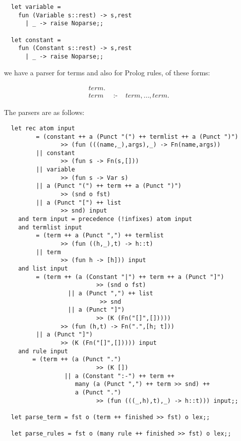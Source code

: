 \begin{boxed}\begin{lstlisting}
  let variable =
    fun (Variable s::rest) -> s,rest
      | _ -> raise Noparse;;

  let constant =
    fun (Constant s::rest) -> s,rest
      | _ -> raise Noparse;;
\end{lstlisting}\end{boxed}

\noindent we have a parser for terms and also for Prolog rules, of these forms:

\begin{eqnarray*}
term\mbox{.}    & &                                             \\
term            & \mbox{ :- } & term,\ldots,term\mbox{.}
\end{eqnarray*}

\noindent The parsers are as follows:

\begin{boxed}\begin{lstlisting}
  let rec atom input
         = (constant ++ a (Punct "(") ++ termlist ++ a (Punct ")")
                >> (fun (((name,_),args),_) -> Fn(name,args))
         || constant
                >> (fun s -> Fn(s,[]))
         || variable
                >> (fun s -> Var s)
         || a (Punct "(") ++ term ++ a (Punct ")")
                >> (snd o fst)
         || a (Punct "[") ++ list
                >> snd) input
    and term input = precedence (!infixes) atom input
    and termlist input
         = (term ++ a (Punct ",") ++ termlist
                >> (fun ((h,_),t) -> h::t)
         || term
                >> (fun h -> [h])) input
    and list input
         = (term ++ (a (Constant "|") ++ term ++ a (Punct "]")
                          >> (snd o fst)
                  || a (Punct ",") ++ list
                           >> snd
                  || a (Punct "]")
                          >> (K (Fn("[]",[]))))
                >> (fun (h,t) -> Fn(".",[h; t]))
         || a (Punct "]")
                >> (K (Fn("[]",[])))) input
    and rule input
        = (term ++ (a (Punct ".")
                          >> (K [])
                 || a (Constant ":-") ++ term ++
                    many (a (Punct ",") ++ term >> snd) ++
                    a (Punct ".")
                          >> (fun (((_,h),t),_) -> h::t))) input;;

  let parse_term = fst o (term ++ finished >> fst) o lex;;

  let parse_rules = fst o (many rule ++ finished >> fst) o lex;;
\end{lstlisting}\end{boxed}

